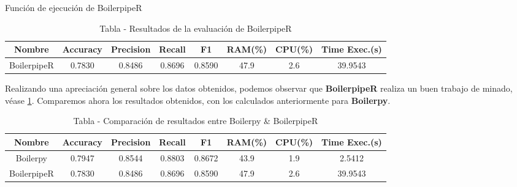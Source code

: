 \begin{codefloat}
    
    \caption{Función de ejecución de BoilerpipeR}
    \label{cod:funcion de ejecucion de boilerpiper 2}
\end{codefloat}

\begin{table}[h]
    \begin{center}
      \begin{tabular}{| c | c | c | c | c | c | c | c |} \hline 
       \textbf{Nombre} & \textbf{Accuracy} & \textbf{Precision}  & \textbf{Recall} & \textbf{F1} & \textbf{RAM(\%)} & \textbf{CPU(\%)} & \textbf{Time Exec.(s)} \\ \hline
       BoilerpipeR & 0.7830 & 0.8486 & 0.8696 & 0.8590 & 47.9 & 2.6 & 39.9543 \\ \hline
      \end{tabular}
      \caption{Tabla - Resultados de la evaluación de BoilerpipeR}
      \label{tab:tabla - resultados de la evaluacion de boilerpiper}
    \end{center}
\end{table}

Realizando una apreciación general sobre los datos obtenidos, podemos observar que \textbf{BoilerpipeR}
realiza un buen trabajo de minado, véase \ref{tab:tabla - resultados de la evaluacion de boilerpiper}.
Comparemos ahora los resultados obtenidos, con los calculados anteriormente para \textbf{Boilerpy}.

\begin{table}[h]
    \begin{center}
      \begin{tabular}{| c | c | c | c | c | c | c | c |} \hline 
       \textbf{Nombre} & \textbf{Accuracy} & \textbf{Precision}  & \textbf{Recall} & \textbf{F1} & \textbf{RAM(\%)} & \textbf{CPU(\%)} & \textbf{Time Exec.(s)} \\ \hline
       Boilerpy & 0.7947 & 0.8544 & 0.8803 & 0.8672 & 43.9 & 1.9 & 2.5412 \\ \hline
       BoilerpipeR & 0.7830 & 0.8486 & 0.8696 & 0.8590 & 47.9 & 2.6 & 39.9543 \\ \hline
      \end{tabular}
      \caption{Tabla - Comparación de resultados entre Boilerpy \& BoilerpipeR}
      \label{tab:tabla - comparacion de resultados entre boilerpy y boilerpiper}
    \end{center}
\end{table}

